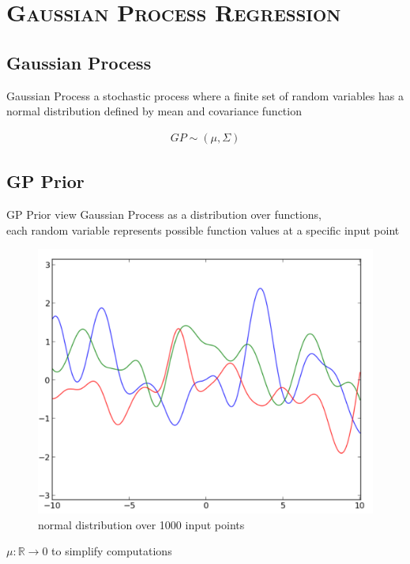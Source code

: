 \documentclass[xcolor=x11names,compress]{beamer}
\begin{document}
    \section{\scshape Gaussian Process Regression}
    \subsection{Gaussian Process}
    \begin{frame}{Gaussian Process}
        a stochastic process where a finite set of random variables has a normal distribution
        defined by mean and covariance function

        \begin{align*}
            GP \sim (\mu, \Sigma)
        \end{align*}
    \end{frame}

    \subsection{GP Prior}
    \begin{frame}{GP Prior}
        view Gaussian Process as a distribution over functions,\\
        each random variable represents possible function values at a specific input point\\

        \begin{figure}
            \centering
            \includegraphics[width=.6\textwidth]{../resources/figures/gp_prior.pdf}
            \caption{normal distribution over 1000 input points}
        \end{figure}

        $\mu : \mathbb{R} \rightarrow 0$ to simplify computations
    \end{frame}
\end{document}
